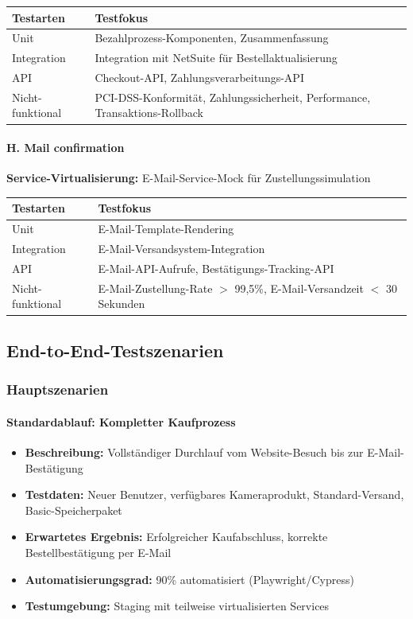 \begin{tabular}{|p{3cm}|p{12cm}|}
\hline
\textbf{Testarten} & \textbf{Testfokus} \\
\hline
Unit & Bezahlprozess-Komponenten, Zusammenfassung \\
\hline
Integration & Integration mit NetSuite für Bestellaktualisierung \\
\hline
API & Checkout-API, Zahlungsverarbeitungs-API \\
\hline
Nicht-funktional & PCI-DSS-Konformität, Zahlungssicherheit, Performance, Transaktions-Rollback \\
\hline
\end{tabular}

\newpage

\paragraph{H. Mail confirmation\\}
\textbf{Service-Virtualisierung:} E-Mail-Service-Mock für Zustellungssimulation\\

\begin{tabular}{|p{3cm}|p{12cm}|}
\hline
\textbf{Testarten} & \textbf{Testfokus} \\
\hline
Unit & E-Mail-Template-Rendering \\
\hline
Integration & E-Mail-Versandsystem-Integration \\
\hline
API & E-Mail-API-Aufrufe, Bestätigungs-Tracking-API \\
\hline
Nicht-funktional & E-Mail-Zustellung-Rate $>$ 99,5\%, E-Mail-Versandzeit $<$ 30 Sekunden \\
\hline
\end{tabular}

\subsection{End-to-End-Testszenarien}
\subsubsection{Hauptszenarien}
\paragraph{Standardablauf: Kompletter Kaufprozess}
\begin{itemize}
\item \textbf{Beschreibung:} Vollständiger Durchlauf vom Website-Besuch bis zur E-Mail-Bestätigung
\item \textbf{Testdaten:} Neuer Benutzer, verfügbares Kameraprodukt, Standard-Versand, Basic-Speicherpaket
\item \textbf{Erwartetes Ergebnis:} Erfolgreicher Kaufabschluss, korrekte Bestellbestätigung per E-Mail
\item \textbf{Automatisierungsgrad:} 90\% automatisiert (Playwright/Cypress)
\item \textbf{Testumgebung:} Staging mit teilweise virtualisierten Services
\end{itemize}
